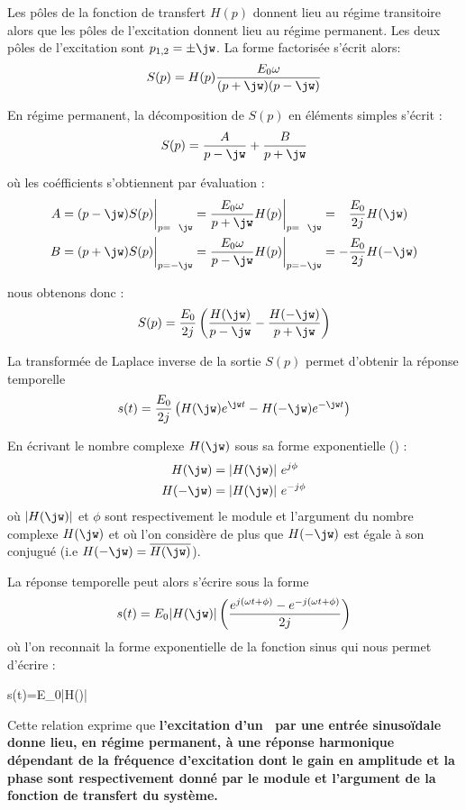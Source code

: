 Les pôles de la fonction de transfert $H(p)$ donnent lieu au 
régime transitoire alors que les pôles de l'excitation donnent 
lieu au régime permanent. 
Les deux pôles de l'excitation sont $p_{1,2}=\pm\jw$. La forme factorisée s'écrit alors:
$$
S(p)=H(p)\dfrac{E_0\omega}{(p+\jw)(p-\jw)}
$$

En régime permanent, la décomposition de $S(p)$ en éléments simples s'écrit :
$$
S(p)=\dfrac{A}{p-\jw} + \dfrac{B}{p+\jw}
$$

où les coéfficients s'obtiennent par évaluation :
\begin{align*}
    A&=(p-\jw)S(p)\bigg|_{p=\hphantom{-}\jw} =\dfrac{E_0\omega}{p+\jw}H(p)\bigg|_{p=\hphantom{-}\jw} =\hphantom{-}\dfrac{E_0}{2j}H(\jw)\\
    B&=(p+\jw)S(p)\bigg|_{p=-\jw}=\dfrac{E_0\omega}{p-\jw}H(p)\bigg|_{p=-\jw}=-\dfrac{E_0}{2j}H(-\jw)
\end{align*}

nous obtenons donc :
$$
S(p)=\dfrac{E_0}{2j}\left(\dfrac{H(\jw)}{p-\jw}-\dfrac{H(-\jw)}{p+\jw} \right)
$$

La transformée de Laplace inverse de la sortie $S(p)$ permet d'obtenir la réponse temporelle 
$$
s(t)=\dfrac{E_0}{2j}\left(H(\jw)e^{\jw t}-H(-\jw)e^{-\jw t}\right)
$$

En écrivant le nombre complexe $H(\jw)$ sous sa forme exponentielle () :
\begin{align*}
    H(\jw)  &= |H(\jw)| e^{j\phi} \\
    H(-\jw) &= |H(\jw)| e^{-j\phi}
\end{align*}
où $|H(\jw)|$ et $\phi$ sont respectivement le module et l'argument du nombre complexe $H(\jw)$ 
et où l'on considère de plus que $H(-\jw)$ est égale à son conjugué (i.e $H(-\jw)=\overline{H(\jw)}$).

La réponse temporelle peut alors s'écrire sous la forme 
\begin{align*}
    s(t)=E_0|H(\jw)|\left(\dfrac{e^{j(\omega t+\phi)}-e^{-j(\omega t+\phi)}}{2j}\right)
\end{align*}
où l'on reconnait la forme exponentielle de la fonction sinus qui nous permet d'écrire :
\begin{bequation}
    s(t)=E_0|H(\jw)|\label{eq-rh}
\end{bequation}

Cette relation exprime que \textbf{l'excitation d'un {\protect{\SLCI}}~par une entrée sinuso\"idale donne 
lieu, en régime permanent, à une réponse harmonique dépendant de la fréquence d'excitation dont 
le gain en amplitude et la phase sont respectivement donné par le module et l'argument de la fonction
de transfert du système.}

